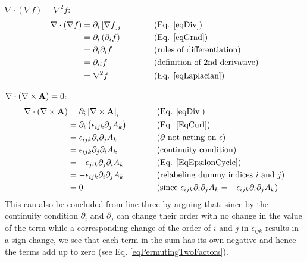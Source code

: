  $\nabla\cdot\left(\nabla f\right)=\nabla^{2}f$:
\begin{equation}
\begin{aligned}\nabla\cdot\left(\nabla f\right) & =\partial_{i}\left[\nabla 
f\right]_{i} & \,\,\,\,\,\,\,\,\,\,\,\,\,\,\,\,\,\, & \text{(Eq. \ref{eqDiv})}\\
 & =\partial_{i}\left(\partial_{i}f\right) &  & \text{(Eq. \ref{eqGrad})}\\
 & =\partial_{i}\partial_{i}f &  & \text{(rules of differentiation)}\\
 & =\partial_{ii}f &  & \text{(definition of 2nd derivative)}\\
 & =\nabla^{2}f &  & \text{(Eq. \ref{eqLaplacian})}
\end{aligned}
\end{equation}


 $\nabla\cdot\left(\nabla\times\mathbf{ A}\right)=0$:
\begin{equation}
\begin{aligned}\nabla\cdot\left(\nabla\times\mathbf{ A}\right) & 
=\partial_{i}\left[\nabla\times\mathbf{ A}\right]_{i} & 
\,\,\,\,\,\,\,\,\,\,\,\,\,\,\,\, & \text{(Eq. \ref{eqDiv})}\\
 & =\partial_{i}\left(\epsilon_{ijk}\partial_{j}A_{k}\right) &  & \text{(Eq. 
\ref{EqCurl})}\\
 & =\epsilon_{ijk}\partial_{i}\partial_{j}A_{k} &  & 
\text{(\ensuremath{\partial}\ not acting on \ensuremath{\epsilon})}\\
 & =\epsilon_{ijk}\partial_{j}\partial_{i}A_{k} &  & \text{(continuity 
condition)}\\
 & =-\epsilon_{jik}\partial_{j}\partial_{i}A_{k} &  & \text{(Eq. 
\ref{EqEpsilonCycle})}\\
 & =-\epsilon_{ijk}\partial_{i}\partial_{j}A_{k} &  & \text{(relabeling dummy 
indices \ensuremath{i} and \ensuremath{j})}\\
 & =0 &  & \text{(since 
\ensuremath{\epsilon_{ijk}\partial_{i}\partial_{j}A_{k}=-\epsilon_{ijk}\partial_
{i}\partial_{j}A_{k}})}
\end{aligned}
\end{equation}
This can also be concluded from line three by arguing that: since
by the continuity condition $\partial_{i}$ and $\partial_{j}$ can
change their order with no change in the value of the term while a
corresponding change of the order of $i$ and $j$ in $\epsilon_{ijk}$
results in a sign change, we see that each term in the sum has its
own negative and hence the terms add up to zero (see Eq. 
\ref{eqPermutingTwoFactors}).

